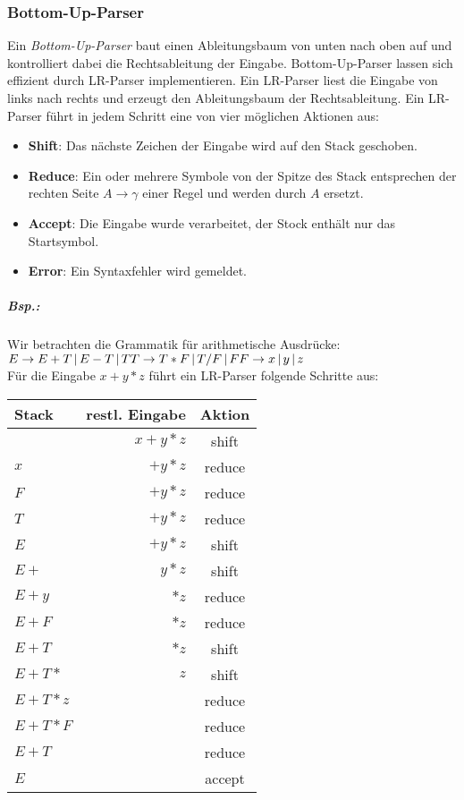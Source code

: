 \subsubsection{Bottom-Up-Parser}
Ein \emph{Bottom-Up-Parser} baut einen Ableitungsbaum von unten nach oben auf und kontrolliert dabei die Rechtsableitung der Eingabe. Bottom-Up-Parser lassen sich effizient durch LR-Parser implementieren. Ein LR-Parser liest die Eingabe von links nach rechts und erzeugt den Ableitungsbaum der Rechtsableitung. Ein LR-Parser führt in jedem Schritt eine von vier möglichen Aktionen aus:
\begin{itemize}
\item \textbf{Shift}: Das nächste Zeichen der Eingabe wird auf den Stack geschoben.
\item \textbf{Reduce}: Ein oder mehrere Symbole von der Spitze des Stack entsprechen der rechten Seite $A \to \gamma$ einer Regel und werden durch $A$ ersetzt.
\item \textbf{Accept}: Die Eingabe wurde verarbeitet, der Stock enthält nur das Startsymbol.
\item \textbf{Error}: Ein Syntaxfehler wird gemeldet.
\end{itemize}
\subparagraph{Bsp.:} Wir betrachten die Grammatik für arithmetische Ausdrücke:\\
$E \to E + T \,|\, E-T \,|\, T\\
T \to T*F \,|\, T/F \,|\, F\\
F \to x \,|\, y \,|\, z$\\
Für die Eingabe $x+y*z$ führt ein LR-Parser folgende Schritte aus:\\
\begin{tabular}{l r c}
Stack & restl. Eingabe &Aktion\\
\hline
& $x+y*z$ & shift\\
$x$ & $+y*z$ & reduce\\
$F$ & $+y*z$ & reduce\\
$T$ & $+y*z$ & reduce\\
$E$ & $+y*z$ & shift \\
$E+$ & $y*z$ & shift \\
$E+y$ & $*z$ & reduce\\
$E+F$ & $*z$ & reduce\\
$E+T$ & $*z$ & shift\footnotemark\\
$E+T*$ & $z$ & shift \\
$E+T*z$ & & reduce \\
$E+T*F$ & & reduce \\
$E+T$ & & reduce \\
$E$ & & accept
\end{tabular}
